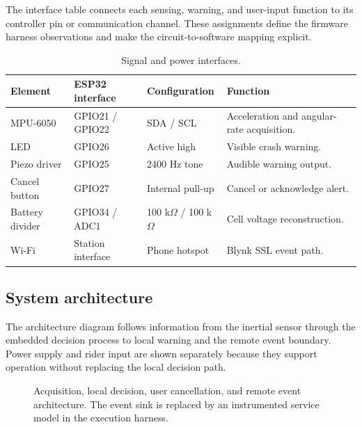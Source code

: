 \documentclass[10pt,a4paper]{article}
\begin{document}
The interface table connects each sensing, warning, and user-input function to its controller pin or communication channel. These assignments define the firmware harness observations and make the circuit-to-software mapping explicit.

\begin{table}[H]\centering\small\caption{Signal and power interfaces.}
\begin{tabularx}{\linewidth}{@{}lllX@{}}\toprule
Element & ESP32 interface & Configuration & Function\\\midrule
MPU-6050 & GPIO21 / GPIO22 & SDA / SCL & Acceleration and angular-rate acquisition.\\
LED & GPIO26 & Active high & Visible crash warning.\\
Piezo driver & GPIO25 & 2400 Hz tone & Audible warning output.\\
Cancel button & GPIO27 & Internal pull-up & Cancel or acknowledge alert.\\
Battery divider & GPIO34 / ADC1 & 100 k$\Omega$ / 100 k$\Omega$ & Cell voltage reconstruction.\\
Wi-Fi & Station interface & Phone hotspot & Blynk SSL event path.\\\bottomrule
\end{tabularx}\end{table}

\subsection{System architecture}
The architecture diagram follows information from the inertial sensor through the embedded decision process to local warning and the remote event boundary. Power supply and rider input are shown separately because they support operation without replacing the local decision path.

\begin{figure}[H]\centering
{}
\caption{Acquisition, local decision, user cancellation, and remote event architecture. The event sink is replaced by an instrumented service model in the execution harness.}
\end{figure}
\end{document}

